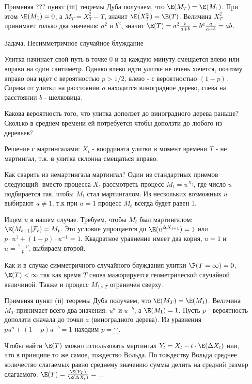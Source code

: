 {Применяя ??? пункт (iii) теоремы Дуба получаем, что $\E(M_{T})=\E(M_{1})$. При этом $\E(M_{1})=0$, а $M_{T}=X_{T}^{2}-T$, значит $\E(X_{T}^{2})=\E(T)$. Величина $X_{T}^{2}$ принимает только два значения: $a^{2}$ и $b^{2}$, значит $\E(T)=a^{2}\frac{b}{a+b}+b^{a}\frac{a}{a+b}=ab$.

Задача. Несимметричное случайное блуждание 

Улитка начинает свой путь в точке 0 и за каждую минуту смещается влево или вправо на один сантиметр. Однако влево идти улитке не очень хочется, поэтому вправо она идет с вероятностью $p>1/2$, влево - с вероятностью $(1-p)$. Справа от улитки на расстоянии $a$ находится виноградное дерево, слева на расстоянии $b$ - шелковица.

Какова вероятность того, что улитка доползет до виноградного дерева раньше? Сколько в среднем времени ей потребуется чтобы доползти до любого из деревьев?

Решение с мартингалами: $X_{t}$ - координата улитки в момент времени $T$ - не мартингал, т.к. в улитка склонна смещаться вправо.

Как сварить из немартингала мартингал? Один из стандартных приемов следующий: вместо процесса $X_{t}$ рассмотреть процесс $M_{t}=u^{X_{t}}$, где число $u$ подбирается так, чтобы $M_{t}$ стал мартингалом. Из нескольких возможных $u$ выбирают $u\neq 1$, т.к при $u=1$ процесс $M_{t}$ всегда будет равен 1.

Ищем $u$ в нашем случае. Требуем, чтобы $M_{t}$ был мартингалом: $\E(M_{t+1}|\mathcal{F}_{t})=M_{t}$. Это условие упрощается до $\E(u^{\Delta{X}_{t+1}})=1$ или $p\cdot u^{1}+(1-p)\cdot u^{-1}=1$.
Квадратное уравнение имеет два корня, $u=1$ и $u=\frac{1-p}{p}$, выбираем второй.

Как и в случае симметричного случайного блуждания улитки $\P(T=\infty)=0$, $\E(T)<\infty$ так как время $T$ снова мажорируется геометрической случайной величиной. Также и процесс $M_{t\wedge T}$ ограничен сверху.

Применяя пункт (ii) теоремы Дуба получаем, что $\E(M_{T})=\E(M_{1})$. Величина $M_{T}$ принимает всего два значения: $u^{a}$ и $u^{-b}$, а $\E(M_{1})=1$. Пусть $p$ - вероятность доползти сначала до точки $a$ (виноградного дерева). Из уравнения $pu^{a}+(1-p)u^{-b}=1$ находим $p=\frac{...}{...}$.

Чтобы найти $\E(T)$ можно использовать мартингал $Y_{t}=X_{t}-t\cdot \E(\Delta X_{t})$ или, что в принципе то же самое, тождество Вольда. По тождеству Вольда среднее количество слагаемых равно среднему значению суммы делить на средний размер слагаемого: $\E(T)=\frac{\E(Y_{T})}{\E(\Delta X_{t})}=...$ 


}

